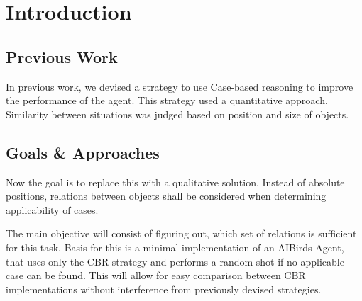 \section{Introduction}


\subsection{Previous Work}
In previous work, we devised a strategy to use Case-based reasoning to improve the performance of the agent. This strategy used a quantitative approach. Similarity between situations was judged based on position and size of objects.


\subsection{Goals \& Approaches}

Now the goal is to replace this with a qualitative solution.
Instead of absolute positions, relations between objects shall be considered when determining applicability of cases.

The main objective will consist of figuring out, which set of relations is sufficient for this task. Basis for this is a minimal implementation of an AIBirds Agent, that uses only the CBR strategy and performs a random 
shot if no applicable case can be found. 
This will allow for easy comparison between CBR implementations without interference from previously devised strategies.